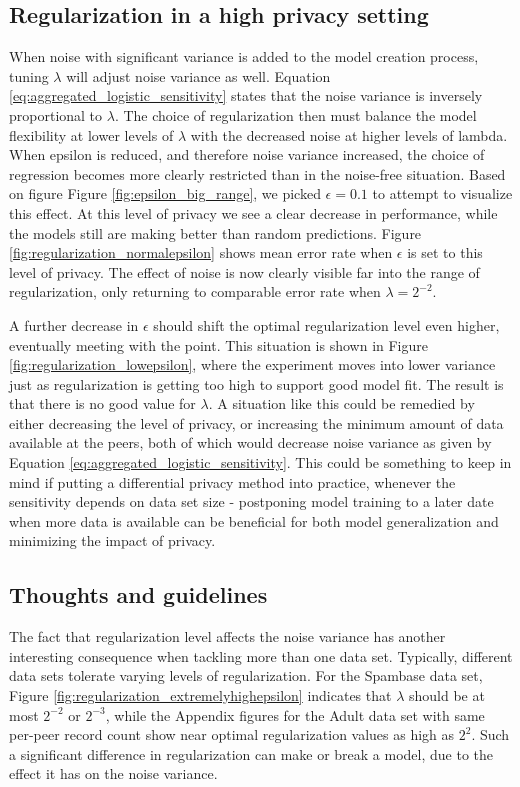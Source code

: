 \subsection{Regularization in a high privacy setting}

When noise with significant variance is added to the model creation process, tuning $\lambda$ will adjust noise variance as well. Equation \ref{eq:aggregated_logistic_sensitivity} states that the noise variance is inversely proportional to $\lambda$. The choice of regularization then must balance the model flexibility at lower levels of $\lambda$ with the decreased noise at higher levels of lambda. When epsilon is reduced, and therefore noise variance increased, the choice of regression becomes more clearly restricted than in the noise-free situation. Based on figure Figure \ref{fig:epsilon_big_range}, we picked $\epsilon = 0.1$ to attempt to visualize this effect. At this level of privacy we see a clear decrease in performance, while the models still are making better than random predictions. Figure \ref{fig:regularization_normalepsilon} shows mean error rate when $\epsilon$ is set to this level of privacy. The effect of noise is now clearly visible far into the range of regularization, only returning to comparable error rate when $\lambda = 2^{-2}$. 

A further decrease in $\epsilon$ should shift the optimal regularization level even higher, eventually meeting with the point. This situation is shown in Figure \ref{fig:regularization_lowepsilon}, where the experiment moves into lower variance just as regularization is getting too high to support good model fit. The result is that there is no good value for $\lambda$. A situation like this could be remedied by either decreasing the level of privacy, or increasing the minimum amount of data available at the peers, both of which would decrease noise variance as given by Equation \ref{eq:aggregated_logistic_sensitivity}. This could be something to keep in mind if putting a differential privacy method into practice, whenever the sensitivity depends on data set size - postponing model training to a later date when more data is available can be beneficial for both model generalization and minimizing the impact of privacy.

\subsection{Thoughts and guidelines}

The fact that regularization level affects the noise variance has another interesting consequence when tackling more than one data set. Typically, different data sets tolerate varying levels of regularization. For the Spambase data set, Figure \ref{fig:regularization_extremelyhighepsilon} indicates that $\lambda$ should be at most $2^{-2}$ or $2^{-3}$, while the Appendix figures for the Adult data set with same per-peer record count show near optimal regularization values as high as $2^2$. Such a significant difference in regularization can make or break a model, due to the effect it has on the noise variance.

